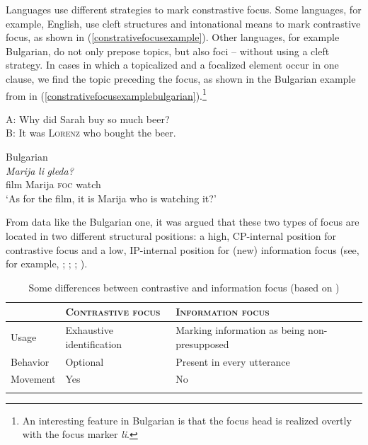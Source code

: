Languages use different strategies to mark constrastive focus. Some languages, for example, English, use cleft structures and intonational means to mark contrastive focus, as shown in (\ref{constrativefocusexample}). Other languages, for example Bulgarian, do not only prepose topics, but also foci -- without using a cleft strategy. In cases in which a topicalized and a focalized element occur in one clause, we find the topic preceding the focus, as shown in the Bulgarian example from \citet[72]{van1995focus} in (\ref{constrativefocusexamplebulgarian}).\footnote{ An interesting feature in Bulgarian is that the focus head is realized overtly with the focus marker \textit{li}. }

\begin{exe}
\ex A: Why did Sarah buy so much beer?\\
B: It was \textsc{Lorenz} who bought the beer. \label{constrativefocusexample}
\end{exe}

\begin{exe}
\ex Bulgarian \citep[72]{van1995focus} \\  {\textit{Marija}} {\textit{li}} {\textit{gleda?}}  \\
{film} {Marija} {\textsc{foc}} {watch} \\
\trans `As for the film, it is Marija who is watching it?'   \label{constrativefocusexamplebulgarian}
\end{exe}

\noindent From data like the Bulgarian one, it was argued that these two types of focus are located in two different structural positions: a high, CP-internal position for contrastive focus and a low, IP-internal position for (new) information focus (see, for example, \citealt{beninca2001position}; \citealt{benincapol2004topic}; \citealt{belletti2004aspects}; \citealt{belletti2003i}).

\begin{table}[t]
\centering

\begin{tabular}{p{2.5cm}p{4.5cm}p{4.5cm}}
\lsptoprule
 & \textsc{Contrastive focus} & \textsc{Information focus} \\
\midrule
\rowcolor[gray]{.9}
Usage & Exhaustive identification & Marking information as being non-presupposed \\
Behavior & Optional & Present in every utterance \\
\rowcolor[gray]{.9}
Movement & Yes & No \\
\lspbottomrule
\end{tabular}
\caption{Some differences between contrastive and information focus (based on \citealt{kiss1998identificational})}
\label{ldhtdiff}
\end{table}








